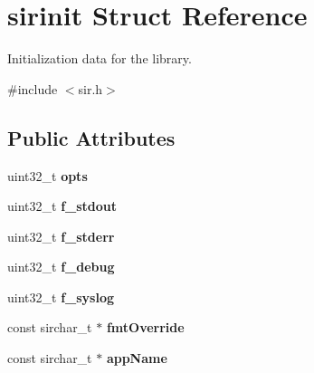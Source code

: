 \hypertarget{structsirinit}{}\section{sirinit Struct Reference}
\label{structsirinit}


Initialization data for the library.  




{\ttfamily \#include $<$sir.\+h$>$}

\subsection*{Public Attributes}
\begin{DoxyCompactItemize}
\item 
uint32\+\_\+t {\bfseries opts}\hypertarget{structsirinit_a8a16d181e8dde73266d6b6e45e8bd9c0}{}\label{structsirinit_a8a16d181e8dde73266d6b6e45e8bd9c0}

\item 
uint32\+\_\+t {\bfseries f\+\_\+stdout}\hypertarget{structsirinit_a3cd9b91059bd65f1562ba7f6afd40f8c}{}\label{structsirinit_a3cd9b91059bd65f1562ba7f6afd40f8c}

\item 
uint32\+\_\+t {\bfseries f\+\_\+stderr}\hypertarget{structsirinit_a0bcca99abfd9d8b18d62f263187a28b1}{}\label{structsirinit_a0bcca99abfd9d8b18d62f263187a28b1}

\item 
uint32\+\_\+t {\bfseries f\+\_\+debug}\hypertarget{structsirinit_abec44c66fd017d2b572d4b4665e49b27}{}\label{structsirinit_abec44c66fd017d2b572d4b4665e49b27}

\item 
uint32\+\_\+t {\bfseries f\+\_\+syslog}\hypertarget{structsirinit_a12495a5dc6bff02e01274c2eb38ec362}{}\label{structsirinit_a12495a5dc6bff02e01274c2eb38ec362}

\item 
const sirchar\+\_\+t $\ast$ {\bfseries fmt\+Override}\hypertarget{structsirinit_a240e4460d815b73ae7b34e40d4f703f6}{}\label{structsirinit_a240e4460d815b73ae7b34e40d4f703f6}

\item 
const sirchar\+\_\+t $\ast$ {\bfseries app\+Name}\hypertarget{structsirinit_aeb5ae1905f653b2ba48bc46230cfc0cc}{}\label{structsirinit_aeb5ae1905f653b2ba48bc46230cfc0cc}

\end{DoxyCompactItemize}


